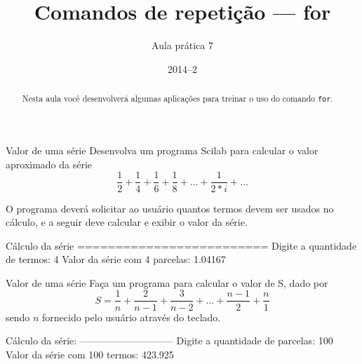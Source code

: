 \documentclass[11pt,fleqn]{practice}
\begin{document}
\subtitle{Aula prática 7}
\title{Comandos de repetição --- \textbf{for}}
\author{}
\date{2014--2}
\maketitle

\begin{abstract}
  Nesta aula você desenvolverá algumas aplicações para treinar o uso do
  comando \texttt{for}.
\end{abstract}

\tableofcontents

\begin{task}[breakable]{Valor de uma série}{}
  Desenvolva um programa Scilab para calcular o valor aproximado da série
  \[ \frac{1}{2} + \frac{1}{4} + \frac{1}{6} + \frac{1}{8} + \ldots +
  \frac{1}{2*i} + \ldots \]

  O programa deverá solicitar ao usuário quantos termos devem ser usados
  no cálculo, e a seguir deve calcular e exibir o valor da série.

  \begin{runexample}
Cálculo da série
=========================
Digite a quantidade de termos: 4
Valor da série com 4 parcelas: 1.04167
  \end{runexample}
  \tcblower
  \solution
\end{task}

\begin{task}[breakable]{Valor de uma série}{}
  Faça um programa para calcular o valor de S, dado por
  \[ S = \frac{1}{n} + \frac{2}{n-1} + \frac{3}{n-2} + \ldots + \frac{n-1}{2} +
  \frac{n}{1} \]
  sendo $n$ fornecido pelo usuário através do teclado.

  \begin{runexample}
Cálculo da série:
-----------------------------
Digite a quantidade de parcelas: 100
Valor da série com 100 termos: 423.925
  \end{runexample}

  \tcblower
  \solution
\end{task}
\end{document}
